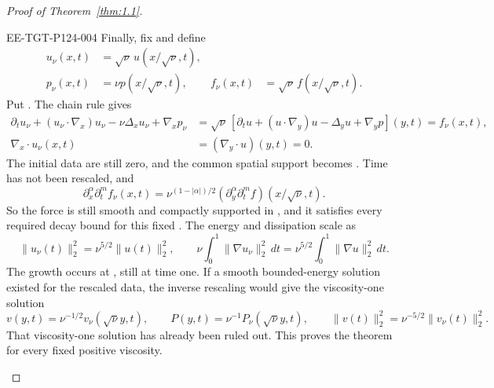 \begin{proof}[Proof of Theorem~\ref{thm:1.1}]
\begin{EESegment}{EE-TGT-P124-004}
Finally, fix  and define
\begin{equation}
\begin{aligned}
  u_\nu(x,t)&=\sqrt\nu\,u(x/\sqrt\nu,t),\\
  p_\nu(x,t)&=\nu p(x/\sqrt\nu,t),
  &f_\nu(x,t)&=\sqrt\nu\,f(x/\sqrt\nu,t).
\end{aligned}
\tag{10.22}\label{eq:10.22}
\end{equation}
Put . The chain rule gives
\[
\begin{aligned}
  \partial_tu_\nu+(u_\nu\cdot\nabla_x)u_\nu-\nu\Delta_xu_\nu+\nabla_xp_\nu
  &=\sqrt\nu\,[\partial_tu+(u\cdot\nabla_y)u-\Delta_yu+\nabla_yp](y,t)
    =f_\nu(x,t),\\
  \nabla_x\cdot u_\nu(x,t)&=(\nabla_y\cdot u)(y,t)=0.
\end{aligned}
\]
The initial data are still zero, and the common spatial support becomes
. Time has not been rescaled,
and
\[
  \partial_x^\alpha\partial_t^m f_\nu(x,t)
  =\nu^{(1-|\alpha|)/2}
   (\partial_y^\alpha\partial_t^m f)(x/\sqrt\nu,t).
\]
So the force is still smooth and compactly supported in
, and it satisfies every required decay
bound for this fixed . The energy and dissipation scale as
\begin{equation}
  \|u_\nu(t)\|_2^2=\nu^{5/2}\|u(t)\|_2^2,\qquad
  \nu\int_0^1\|\nabla u_\nu\|_2^2\,dt
  =\nu^{5/2}\int_0^1\|\nabla u\|_2^2\,dt.
\tag{10.23}\label{eq:10.23}
\end{equation}
The growth occurs at , still at time one. If a
smooth bounded-energy solution  existed for the
rescaled data, the inverse rescaling would give the viscosity-one solution
\[
  v(y,t)=\nu^{-1/2}v_\nu(\sqrt\nu y,t),\qquad
  P(y,t)=\nu^{-1}P_\nu(\sqrt\nu y,t),\qquad
  \|v(t)\|_2^2=\nu^{-5/2}\|v_\nu(t)\|_2^2.
\]
That viscosity-one solution has already been ruled out. This proves the theorem for every
fixed positive viscosity.
\end{EESegment}
\end{proof}

